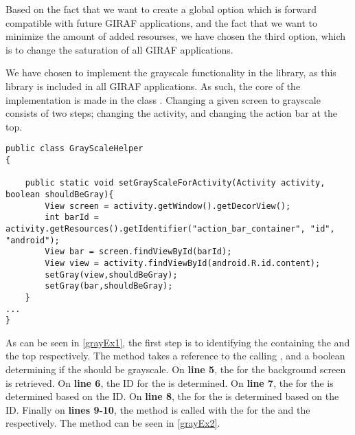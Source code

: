 Based on the fact that we want to create a global option which is forward
compatible with future GIRAF applications, and the fact that we want
to minimize the amount of added resourses, we have chosen the third
option, which is to change the saturation of all GIRAF applications.\nl

We have chosen to implement the grayscale functionality in the
 library, as this library is included in all GIRAF
applications. As such, the core of the implementation is made in the class
. Changing a given screen to grayscale consists of two
steps; changing the activity, and changing the action bar at the top.\nl

\begin{minipage}[H]{\linewidth}
\begin{lstlisting}[caption = Code used to determine the views for the activity and the top action bar., label = grayEx1] 
public class GrayScaleHelper
{

    public static void setGrayScaleForActivity(Activity activity, boolean shouldBeGray){
        View screen = activity.getWindow().getDecorView();
        int barId = activity.getResources().getIdentifier("action_bar_container", "id", "android");
        View bar = screen.findViewById(barId);
        View view = activity.findViewById(android.R.id.content);
        setGray(view,shouldBeGray);
        setGray(bar,shouldBeGray);
    }
...
}
\end{lstlisting}
\end{minipage}

As can be seen in \autoref{grayEx1}, the first step is to identifying the
 containing the  and the top 
respectively. The method  takes a reference to
the calling , and a boolean determining if the 
should be grayscale. On \textbf{line 5}, the  for the background
 screen is retrieved. On \textbf{line 6}, the ID for the
 is determined. On \textbf{line 7}, the  for the
 is determined based on the ID. On \textbf{line 8}, the
 for the  is determined based on the
 ID. Finally on \textbf{lines 9-10}, the 
method is called with the  for the  and the
 respectively. The  method can be seen in
\autoref{grayEx2}.\nl

